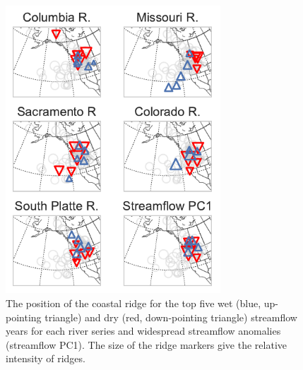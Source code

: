 \documentclass[final, double]{ua-thesis}
\begin{document}
\begin{figure}[ht]
 \centerline{\includegraphics[width=19pc]{p2figures/fig_ridge_streamflow_position.pdf}}
  \caption{The position of the coastal ridge for the top five wet (blue, up-pointing triangle) and dry (red, down-pointing triangle) streamflow years for each river series and widespread streamflow anomalies (streamflow PC1). The size of the ridge markers give the relative intensity of ridges. }\label{fig_ridge_streamflow_position}
\end{figure}

% 
% 
\end{document}
